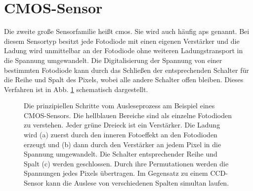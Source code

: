 \section{CMOS-Sensor}
\label{text:cmos_theorie}
Die zweite große Sensorfamilie heißt \gls{cmos}. Sie wird auch häufig \gls{aps} genannt. Bei diesem Sensortyp besitzt jede Fotodiode mit einen eigenen Verstärker und die Ladung wird unmittelbar an der Fotodiode ohne weiteren Ladungstransport in die Spannung umgewandelt. Die Digitalisierung der Spannung von einer bestimmten Fotodiode kann durch das Schließen der entsprechenden Schalter für die Reihe und Spalt des Pixels, wobei alle andere Schalter offen bleiben. Dieses Verfahren ist in Abb. \ref{fig:cmos_scheme} schematisch dargestellt.
\begin{figure}[H]
    \centering
    \hfill
    \hfill
    \caption{Die prinzipiellen Schritte vom Ausleseprozess am Beispiel eines  CMOS-Sensors. Die hellblauen Bereiche sind als einzelne Fotodioden zu verstehen. Jeder grüne Dreieck ist ein Verstärker. Die Ladung wird (a) zuerst durch den inneren Fotoeffekt an den Fotodioden erzeugt und (b) dann durch den Verstärker an jedem Pixel in die Spannung umgewandelt. Die Schalter entsprechender Reihe und Spalt (c) werden geschlossen. Durch ihre Permutationen werden die Spannungen jedes Pixels übertragen. Im Gegensatz zu einem CCD-Sensor kann die Auslese von verschiedenen Spalten simultan laufen.}
    \label{fig:cmos_scheme}
\end{figure}
